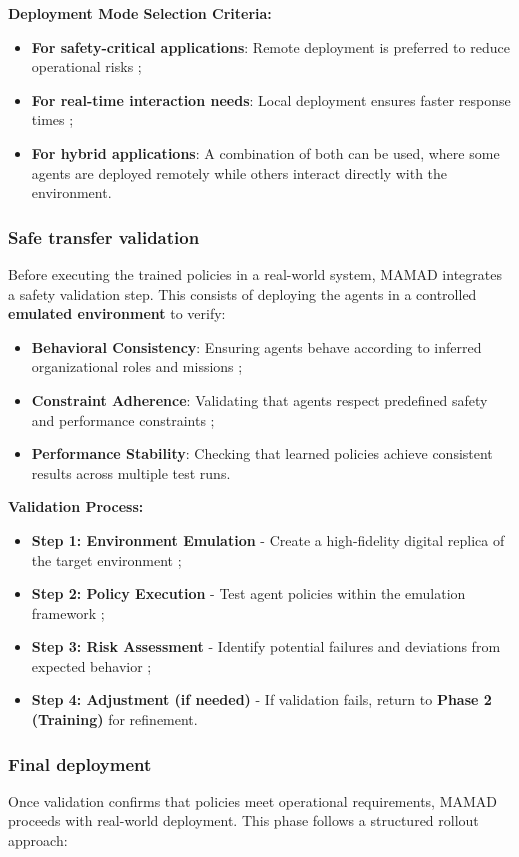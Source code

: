 \documentclass[pdflatex,sn-mathphys-num]{sn-jnl}%
\theoremstyle{thmstyleone}%
\theoremstyle{thmstyletwo}%
\theoremstyle{thmstylethree}%
\begin{document}
\noindent \textbf{Deployment Mode Selection Criteria:}
\begin{itemize}
    \item \textbf{For safety-critical applications}: Remote deployment is preferred to reduce operational risks ;
    \item \textbf{For real-time interaction needs}: Local deployment ensures faster response times ;
    \item \textbf{For hybrid applications}: A combination of both can be used, where some agents are deployed remotely while others interact directly with the environment.
\end{itemize}

\subsubsection{Safe transfer validation}
Before executing the trained policies in a real-world system, MAMAD integrates a safety validation step. This consists of deploying the agents in a controlled \textbf{emulated environment} to verify:
\begin{itemize}
    \item \textbf{Behavioral Consistency}: Ensuring agents behave according to inferred organizational roles and missions ;
    \item \textbf{Constraint Adherence}: Validating that agents respect predefined safety and performance constraints ;
    \item \textbf{Performance Stability}: Checking that learned policies achieve consistent results across multiple test runs.
\end{itemize}

\noindent \textbf{Validation Process:}
\begin{itemize}
    \item \textbf{Step 1: Environment Emulation} - Create a high-fidelity digital replica of the target environment ;
    \item \textbf{Step 2: Policy Execution} - Test agent policies within the emulation framework ;
    \item \textbf{Step 3: Risk Assessment} - Identify potential failures and deviations from expected behavior ;
    \item \textbf{Step 4: Adjustment (if needed)} - If validation fails, return to \textbf{Phase 2 (Training)} for refinement.
\end{itemize}

\subsubsection{Final deployment}
Once validation confirms that policies meet operational requirements, MAMAD proceeds with real-world deployment. This phase follows a structured rollout approach:
\end{document}
